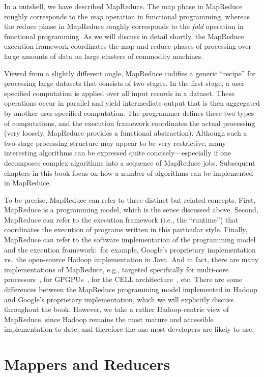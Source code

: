 In a nutshell, we have described MapReduce.  The map phase in
MapReduce roughly corresponds to the \emph{map} operation in functional
programming, whereas the reduce phase in MapReduce roughly corresponds
to the \emph{fold} operation in functional programming.  As we will
discuss in detail shortly, the MapReduce execution framework
coordinates the map and reduce phases of processing over large amounts
of data on large clusters of commodity machines.

Viewed from a slightly different angle, MapReduce codifies a generic
``recipe'' for processing large datasets that consists of two stages.
In the first stage, a user-specified computation is applied over all
input records in a dataset.  These operations occur in parallel and
yield intermediate output that is then aggregated by another
user-specified computation.  The programmer defines these two types of
computations, and the execution framework coordinates the actual
processing (very loosely, MapReduce provides a functional
abstraction).  Although such a two-stage processing structure may
appear to be very restrictive, many interesting algorithms can be
expressed quite concisely---especially if one decomposes complex
algorithms into a sequence of MapReduce jobs.  Subsequent chapters in
this book focus on how a number of algorithms can be implemented in
MapReduce.

To be precise, MapReduce can refer to three distinct but related
concepts.  First, MapReduce is a programming model, which is the sense
discussed above.  Second, MapReduce can refer to the execution
framework (i.e., the ``runtime'') that coordinates the execution of
programs written in this particular style.  Finally, MapReduce can
refer to the software implementation of the programming model and the
execution framework:\ for example, Google's proprietary implementation
vs.\ the open-source Hadoop implementation in Java.  And in fact,
there are many implementations of MapReduce, e.g., targeted
specifically for multi-core processors~\cite{Ranger_etal_2007}, for
GPGPUs~\cite{HeB_etal_2008}, for the CELL
architecture~\cite{Rafique_etal_2009}, etc.  There are some
differences between the MapReduce programming model implemented in
Hadoop and Google's proprietary implementation, which we will
explicitly discuss throughout the book.  However, we take a rather
Hadoop-centric view of MapReduce, since Hadoop remains the most mature
and accessible implementation to date, and therefore the one most
developers are likely to use.

\section{Mappers and Reducers}
\label{chapter2:mappers-and-reducers}

